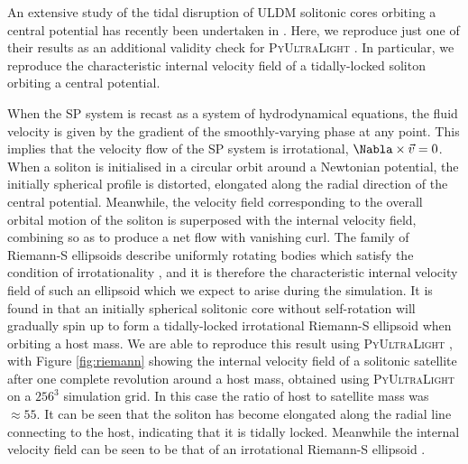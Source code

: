\documentclass[a4paper,11pt]{article}
\newcommand{\PyUltraLight}{\textsc{PyUltraLight }}
\begin{document}
An extensive study of the tidal disruption of ULDM solitonic cores orbiting a central potential has recently been undertaken in \cite{Du2018}. Here, we reproduce just one of their results as an additional validity check for \PyUltraLight. In particular, we reproduce the characteristic internal velocity field of a tidally-locked soliton orbiting a central potential. 

When the SP system is recast as a system of hydrodynamical equations, the fluid velocity is given by the gradient of the smoothly-varying phase at any point. This implies that the velocity flow of the SP system is irrotational, $\Nabla\times\vec{v}=0$. When a soliton is initialised in a circular orbit around a Newtonian potential, the initially spherical profile is distorted, elongated along the radial direction of the central potential. Meanwhile, the velocity field corresponding to the overall orbital motion of the soliton is superposed with the internal velocity field, combining so as to produce a net flow with vanishing curl. The family of Riemann-S ellipsoids describe uniformly rotating bodies which satisfy the condition of irrotationality \cite{Chandrasekhar1965}, and it is therefore the characteristic internal velocity field of such an ellipsoid which we expect to arise during the simulation. It is found in \cite{Du2018} that an initially spherical solitonic core without self-rotation will gradually spin up to form a tidally-locked irrotational Riemann-S ellipsoid when orbiting a host mass. We are able to reproduce this result using \PyUltraLight, with Figure \ref{fig:riemann} showing the internal velocity field of a solitonic satellite after one complete revolution around a host mass, obtained using \PyUltraLight on a $256^3$ simulation grid. In this case the ratio of host to satellite mass was $\approx 55$. It can be seen that the soliton has become elongated along the radial line connecting to the host, indicating that it is tidally locked. Meanwhile the internal velocity field can be seen to be that of an irrotational Riemann-S ellipsoid \cite{Daller2012}.
\end{document}
